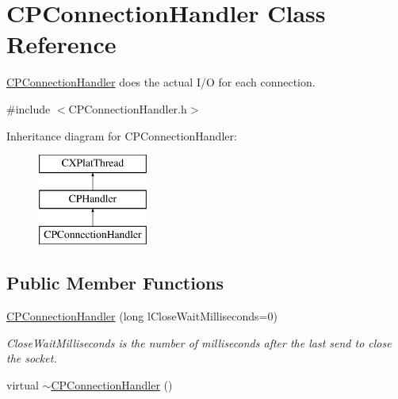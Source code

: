 \hypertarget{class_c_p_connection_handler}{\section{\-C\-P\-Connection\-Handler \-Class \-Reference}
\label{class_c_p_connection_handler}
}


\hyperlink{class_c_p_connection_handler}{\-C\-P\-Connection\-Handler} does the actual \-I/\-O for each connection.  




{\ttfamily \#include $<$\-C\-P\-Connection\-Handler.\-h$>$}

\-Inheritance diagram for \-C\-P\-Connection\-Handler\-:\begin{figure}[H]
\begin{center}
\leavevmode
\includegraphics[height=3.000000cm]{class_c_p_connection_handler}
\end{center}
\end{figure}
\subsection*{\-Public \-Member \-Functions}
\begin{DoxyCompactItemize}
\item 
\hyperlink{class_c_p_connection_handler_ad3f9e12330f2741b4e61a457e0980798}{\-C\-P\-Connection\-Handler} (long l\-Close\-Wait\-Milliseconds=0)
\begin{DoxyCompactList}\small\item\em \-Close\-Wait\-Milliseconds is the number of milliseconds after the last send to close the socket. \end{DoxyCompactList}\item 
virtual \hyperlink{class_c_p_connection_handler_a32a850b632fe1f9bd28dec72e1346ad1}{$\sim$\-C\-P\-Connection\-Handler} ()
\end{DoxyCompactItemize}
